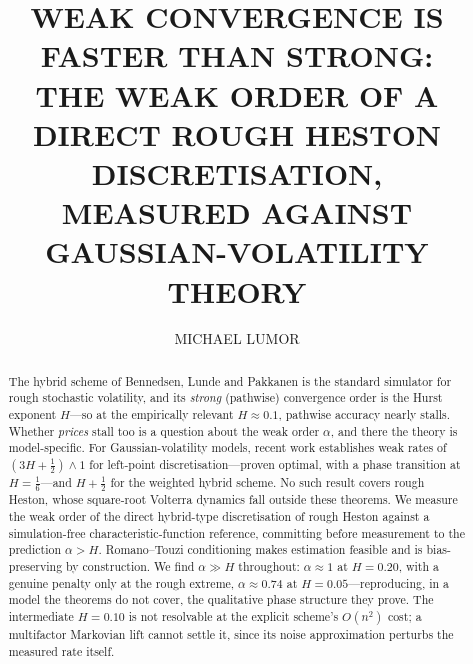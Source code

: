 \documentclass{ws-ijtaf}
\begin{document}


\catchline{}{}{}{}{}

\title{WEAK CONVERGENCE IS FASTER THAN STRONG:\\
THE WEAK ORDER OF A DIRECT ROUGH HESTON DISCRETISATION,\\
MEASURED AGAINST GAUSSIAN-VOLATILITY THEORY}

\author{MICHAEL LUMOR}

\address{School of Science, Engineering and Environment, University of Salford\\
Salford, United Kingdom\\
}

\maketitle

\begin{history}
\end{history}

\begin{abstract}
The hybrid scheme of Bennedsen, Lunde and Pakkanen is the standard simulator for
rough stochastic volatility, and its \emph{strong} (pathwise) convergence order is
the Hurst exponent $H$---so at the empirically relevant $H\approx 0.1$, pathwise
accuracy nearly stalls. Whether \emph{prices} stall too is a question about the
weak order $\alpha$, and there the theory is model-specific. For
Gaussian-volatility models, recent work establishes weak rates of
$(3H+\tfrac12)\wedge 1$ for left-point discretisation---proven optimal, with a
phase transition at $H=\tfrac16$---and $H+\tfrac12$ for the weighted hybrid
scheme. No such result covers rough Heston, whose square-root Volterra dynamics
fall outside these theorems. We measure the weak order of the direct hybrid-type
discretisation of rough Heston against a simulation-free characteristic-function
reference, committing before measurement to the prediction $\alpha>H$.
Romano--Touzi conditioning makes estimation feasible and is bias-preserving by
construction. We find $\alpha\gg H$ throughout: $\alpha\approx 1$ at $H=0.20$,
with a genuine penalty only at the rough extreme, $\alpha\approx 0.74$ at
$H=0.05$---reproducing, in a model the theorems do not cover, the qualitative
phase structure they prove. The intermediate $H=0.10$ is not resolvable at the
explicit scheme's $O(n^2)$ cost; a multifactor Markovian lift cannot settle it,
since its noise approximation perturbs the measured rate itself.
\end{abstract}
\end{document}
